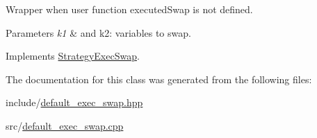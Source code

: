 \-Wrapper when user function executed\-Swap is not defined. 


\begin{DoxyParams}{\-Parameters}
{\em k1} & and k2\-: variables to swap. \\
\hline
\end{DoxyParams}


\-Implements \hyperlink{classStrategyExecSwap_af233f7c89ae323aa30eb1c37c7dbe83c}{\-Strategy\-Exec\-Swap}.



\-The documentation for this class was generated from the following files\-:\begin{DoxyCompactItemize}
\item 
include/\hyperlink{default__exec__swap_8hpp}{default\-\_\-exec\-\_\-swap.\-hpp}\item 
src/\hyperlink{default__exec__swap_8cpp}{default\-\_\-exec\-\_\-swap.\-cpp}\end{DoxyCompactItemize}
